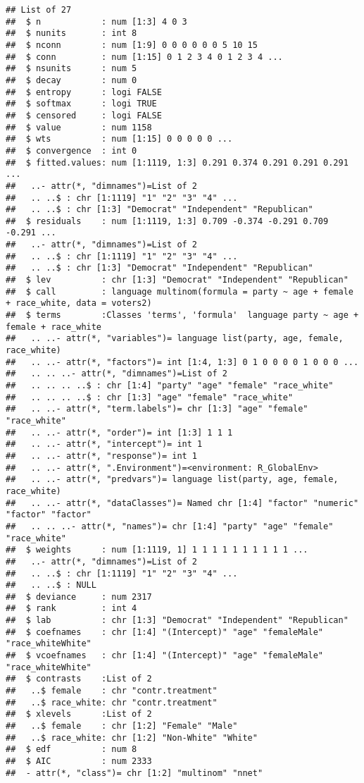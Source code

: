 \documentclass[]{article}
\begin{document}
\begin{verbatim}
## List of 27
##  $ n            : num [1:3] 4 0 3
##  $ nunits       : int 8
##  $ nconn        : num [1:9] 0 0 0 0 0 0 5 10 15
##  $ conn         : num [1:15] 0 1 2 3 4 0 1 2 3 4 ...
##  $ nsunits      : num 5
##  $ decay        : num 0
##  $ entropy      : logi FALSE
##  $ softmax      : logi TRUE
##  $ censored     : logi FALSE
##  $ value        : num 1158
##  $ wts          : num [1:15] 0 0 0 0 0 ...
##  $ convergence  : int 0
##  $ fitted.values: num [1:1119, 1:3] 0.291 0.374 0.291 0.291 0.291 ...
##   ..- attr(*, "dimnames")=List of 2
##   .. ..$ : chr [1:1119] "1" "2" "3" "4" ...
##   .. ..$ : chr [1:3] "Democrat" "Independent" "Republican"
##  $ residuals    : num [1:1119, 1:3] 0.709 -0.374 -0.291 0.709 -0.291 ...
##   ..- attr(*, "dimnames")=List of 2
##   .. ..$ : chr [1:1119] "1" "2" "3" "4" ...
##   .. ..$ : chr [1:3] "Democrat" "Independent" "Republican"
##  $ lev          : chr [1:3] "Democrat" "Independent" "Republican"
##  $ call         : language multinom(formula = party ~ age + female + race_white, data = voters2)
##  $ terms        :Classes 'terms', 'formula'  language party ~ age + female + race_white
##   .. ..- attr(*, "variables")= language list(party, age, female, race_white)
##   .. ..- attr(*, "factors")= int [1:4, 1:3] 0 1 0 0 0 0 1 0 0 0 ...
##   .. .. ..- attr(*, "dimnames")=List of 2
##   .. .. .. ..$ : chr [1:4] "party" "age" "female" "race_white"
##   .. .. .. ..$ : chr [1:3] "age" "female" "race_white"
##   .. ..- attr(*, "term.labels")= chr [1:3] "age" "female" "race_white"
##   .. ..- attr(*, "order")= int [1:3] 1 1 1
##   .. ..- attr(*, "intercept")= int 1
##   .. ..- attr(*, "response")= int 1
##   .. ..- attr(*, ".Environment")=<environment: R_GlobalEnv> 
##   .. ..- attr(*, "predvars")= language list(party, age, female, race_white)
##   .. ..- attr(*, "dataClasses")= Named chr [1:4] "factor" "numeric" "factor" "factor"
##   .. .. ..- attr(*, "names")= chr [1:4] "party" "age" "female" "race_white"
##  $ weights      : num [1:1119, 1] 1 1 1 1 1 1 1 1 1 1 ...
##   ..- attr(*, "dimnames")=List of 2
##   .. ..$ : chr [1:1119] "1" "2" "3" "4" ...
##   .. ..$ : NULL
##  $ deviance     : num 2317
##  $ rank         : int 4
##  $ lab          : chr [1:3] "Democrat" "Independent" "Republican"
##  $ coefnames    : chr [1:4] "(Intercept)" "age" "femaleMale" "race_whiteWhite"
##  $ vcoefnames   : chr [1:4] "(Intercept)" "age" "femaleMale" "race_whiteWhite"
##  $ contrasts    :List of 2
##   ..$ female    : chr "contr.treatment"
##   ..$ race_white: chr "contr.treatment"
##  $ xlevels      :List of 2
##   ..$ female    : chr [1:2] "Female" "Male"
##   ..$ race_white: chr [1:2] "Non-White" "White"
##  $ edf          : num 8
##  $ AIC          : num 2333
##  - attr(*, "class")= chr [1:2] "multinom" "nnet"
\end{verbatim}
\end{document}
